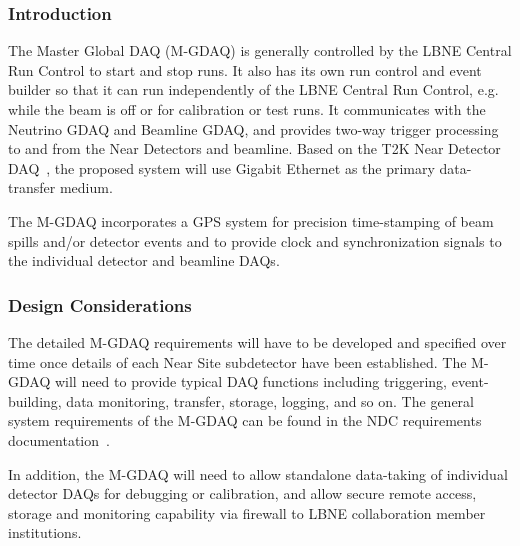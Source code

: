 \subsubsection{Introduction} %

The Master Global DAQ (M-GDAQ) is generally controlled by the LBNE 
Central Run Control to start and stop runs.
It also has its own run 
control and event builder so that it can run independently of the LBNE 
Central Run Control, e.g. while the beam is off or for calibration or 
test runs. It communicates with the Neutrino GDAQ and 
Beamline GDAQ, and provides two-way trigger processing to and from 
the Near Detectors and beamline. Based on the T2K Near Detector DAQ~\cite{ref:T2KNDDAQ},
the proposed system will use Gigabit Ethernet as the primary data-transfer 
medium.



The M-GDAQ incorporates a GPS system %
 for precision 
time-stamping of beam spills and/or detector events and to provide clock 
and synchronization signals to the individual detector and beamline 
DAQs.

\subsubsection{Design Considerations} %

The detailed M-GDAQ
requirements will have to be developed and specified 
over time once details of each Near Site subdetector have been 
established.  
The M-GDAQ will need to provide typical DAQ functions including triggering, event-building, data monitoring, transfer, storage, logging, and so on.   The general system requirements of the M-GDAQ can be found in the NDC requirements documentation~\cite{nd_requirements_doc}.

In addition, the M-GDAQ will need to allow standalone data-taking of individual detector DAQs for 
debugging or calibration, and allow secure remote access, storage and monitoring 
capability via firewall to LBNE collaboration member institutions.

